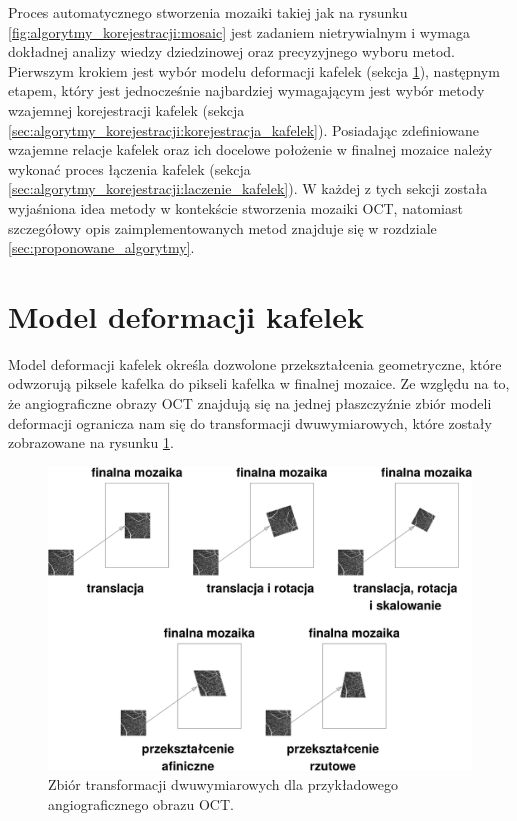 Proces automatycznego stworzenia mozaiki takiej jak na rysunku \ref{fig:algorytmy_korejestracji:mosaic} jest zadaniem nietrywialnym i wymaga dokładnej analizy wiedzy dziedzinowej oraz precyzyjnego wyboru metod. Pierwszym krokiem jest wybór modelu deformacji kafelek (sekcja \ref{sec:algorytmy_korejestracji:model_deformacji}), następnym etapem, który jest jednocześnie najbardziej wymagającym jest wybór metody wzajemnej korejestracji kafelek (sekcja \ref{sec:algorytmy_korejestracji:korejestracja_kafelek}). Posiadając zdefiniowane wzajemne relacje kafelek oraz ich docelowe położenie w finalnej mozaice należy wykonać proces łączenia kafelek (sekcja \ref{sec:algorytmy_korejestracji:laczenie_kafelek}). W każdej z tych sekcji została wyjaśniona idea metody w kontekście stworzenia mozaiki OCT, natomiast szczegółowy opis zaimplementowanych metod znajduje się w rozdziale \ref{sec:proponowane_algorytmy}.

\section{Model deformacji kafelek}
\label{sec:algorytmy_korejestracji:model_deformacji}

Model deformacji kafelek określa dozwolone przekształcenia geometryczne, które odwzorują piksele kafelka do pikseli kafelka w finalnej mozaice. Ze względu na to, że angiograficzne obrazy OCT znajdują się na jednej płaszczyźnie zbiór modeli deformacji ogranicza nam się do transformacji dwuwymiarowych, które zostały zobrazowane na rysunku \ref{fig:algorytmy_korejestracji:trans}.

\begin{figure}[H]
  \centering
  \includegraphics[width=\textwidth]{gfx/trans}
  \caption{Zbiór transformacji dwuwymiarowych dla przykładowego angiograficznego obrazu OCT.}
  \label{fig:algorytmy_korejestracji:trans}
\end{figure}

